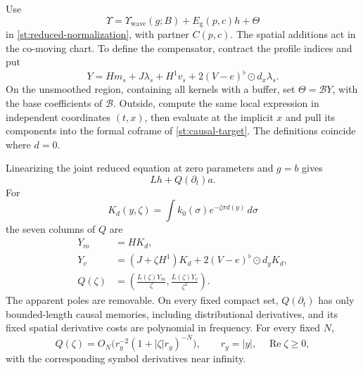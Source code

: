 Use
\begin{equation}\label{st:full-gauge}
 \Upsilon=\Upsilon_{\mathrm{wave}}(g;B)
                   +E_{\mathrm g}(p,c)h+\Theta
\end{equation}
in \eqref{st:reduced-normalization}, with partner $C(p,c)$.
The spatial additions act in the co-moving chart.
To define the compensator, contract the profile indices and put
\begin{equation}\label{st:compensator}
 Y=H m_s+J\lambda_s+H^1v_s
               +2(V-e)^\flat\odot d_x\lambda_s .
\end{equation}
On the unsmoothed region, containing all kernels with a buffer,
set $\Theta=\mathcal B Y$, with the base coefficients of
$\mathcal B$.  Outside, compute the same local expression in
independent coordinates $(t,x)$, then evaluate at the implicit
$x$ and pull its components into the formal coframe of
\eqref{st:causal-target}.  The definitions coincide where $d=0$.

\begin{lemma}\label{st:columns}
Linearizing the joint reduced equation at zero parameters and
$g=b$ gives
\begin{equation}\label{st:joint-linearization}
 Lh+Q(\partial_t)a.
\end{equation}
For
\[
 K_d(y,\zeta)=\int k_0(\sigma)e^{-\zeta\sigma d(y)}\,d\sigma
\]
the seven columns of $Q$ are
\begin{equation}\label{st:Q-definition}
 \begin{split}
 Y_m&=H K_d,\\
 Y_v&=(J+\zeta H^1)K_d
                   +2(V-e)^\flat\odot d_yK_d,\\
 Q(\zeta)&=
   \left(\frac{L(\zeta)Y_m}{\zeta},
         \frac{L(\zeta)Y_v}{\zeta^2}\right).
 \end{split}
\end{equation}
The apparent poles are removable.  On every fixed compact set,
$Q(\partial_t)$ has only bounded-length causal memories,
including distributional derivatives, and its fixed spatial
derivative costs are polynomial in frequency.  For every
fixed $N$,
\begin{equation}\label{st:Q-tail}
 Q(\zeta)=O_N\bigl(r_y^{-2}(1+|\zeta|r_y)^{-N}\bigr),
 \qquad r_y=|y|,\quad \operatorname{Re}\zeta\geq0,
\end{equation}
with the corresponding symbol derivatives near infinity.
\end{lemma}

